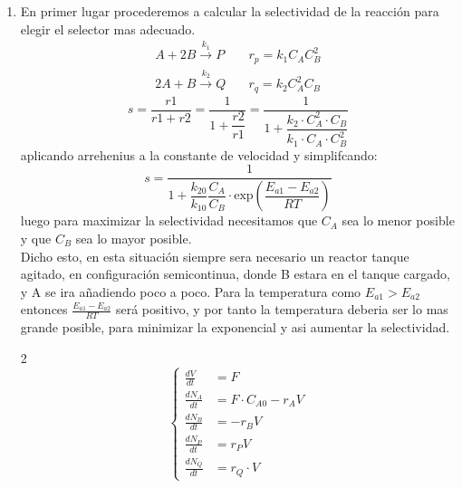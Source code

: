 \solve{}
\begin{enumerate}[label={\alph*)}]
	\item En primer lugar procederemos a calcular la selectividad de la reacción para elegir el selector mas adecuado.
	      \label{2A_2020}
	      \begin{align*}
		      A +2B \xrightarrow{k_1} P \quad  & r_p = k_1 C_A C_B^2 \\
		      2A + B \xrightarrow{k_2} Q \quad & r_q = k_2 C_A^2 C_B
	      \end{align*}
	      \begin{equation*}
		      s = \frac{r1}{r1+r2} = \frac{1}{1+\dfrac{r2}{r1}}= \frac{1}{1+\dfrac{k_2\cdot C_A^2\cdot C_B}{k_1\cdot C_A \cdot C_B^2}}
	      \end{equation*}
	      aplicando arrehenius a la constante de velocidad y simplifcando:
	      \begin{equation}
		      s = \frac{1}{1+\dfrac{k_{20}}{k_{10}} \dfrac{C_A}{C_B}\cdot \text{exp}\left(\dfrac{E_{a1}-E_{a2}}{RT}\right)}
	      \end{equation}
	      luego para maximizar la selectividad necesitamos que $C_A$ sea lo menor posible y que $C_B$ sea lo mayor posible.\\
	      Dicho esto, en esta situación siempre sera necesario un reactor tanque agitado, en configuración semicontinua, donde B estara en el tanque cargado, y A se ira añadiendo poco a poco.
	      Para la temperatura como $E_{a1} > E_{a2}$ entonces $\frac{E_{a1}-E_{a2}}{RT}$ será positivo, y por tanto la temperatura deberia ser lo mas grande posible, para minimizar la exponencial y asi aumentar la selectividad.\\
	      \begin{center}
	      \end{center}
	      \newpage
	      \begin{multicols}{2}
		      \begin{equation*}
			      \left\{
			      \begin{aligned}
				      \frac{dV}{dt}   & = F                      \\[6pt]
				      \frac{dN_A}{dt} & = F \cdot C_{A0} - r_A V \\[6pt]
				      \frac{dN_B}{dt} & = - r_B V                \\[6pt]
				      \frac{dN_P}{dt} & = r_P V                  \\[6pt]
				      \frac{dN_Q}{dt} & = r_Q \cdot V
			      \end{aligned}
			      \right.
		      \end{equation*}


\end{multicols}
\end{enumerate}
